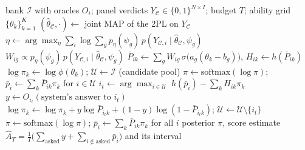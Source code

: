 \begin{algorithm}[t]
\caption{EOST-M: calibration-marginal adaptive test with one-step (myopic) expected-information-gain selection}
\label{alg:eost}
\small
\begin{algorithmic}[1]
\Require bank $\mathcal I$ with oracles $O_i$; panel verdicts $Y_{\mathcal C}\in\{0,1\}^{N\times I}$; budget $T$; ability grid $\{\theta_k\}_{k=1}^{K}$
\State $(\hat\theta_{\mathcal C},\cdot)\gets$ joint MAP of the 2PL on $Y_{\mathcal C}$ 
\State $\eta\gets\arg\max_\eta\sum_i\log\sum_g p_\eta(\psi_g)\,p(Y_{\mathcal C,i}\mid\hat\theta_{\mathcal C},\psi_g)$ 
\State $W_{ig}\propto p_\eta(\psi_g)\,p(Y_{\mathcal C,i}\mid\hat\theta_{\mathcal C},\psi_g)$ 
\State $\bar P_{ik}\gets\sum_gW_{ig}\,\sigma\big(a_g(\theta_k-b_g)\big)$, \;$H_{ik}\gets h(\bar P_{ik})$ 
\State $\log\pi_k\gets\log\phi(\theta_k)$;\; $\mathcal U\gets\mathcal I$ (candidate pool)
  \State $\pi\gets\mathrm{softmax}(\log\pi)$;\; $\bar p_i\gets\sum_k\bar P_{ik}\pi_k$ for $i\in\mathcal U$
  \State $i_t\gets\arg\max_{i\in\mathcal U}\;h(\bar p_i)-\sum_kH_{ik}\pi_k$ 
  \State $y\gets O_{i_t}(\text{system's answer to } i_t)$ 
  \State $\log\pi_k\gets\log\pi_k+y\log\bar P_{i_tk}+(1-y)\log(1-\bar P_{i_tk})$;\; $\mathcal U\gets\mathcal U\setminus\{i_t\}$
\EndFor
\State $\pi\gets\mathrm{softmax}(\log\pi)$;\; $\bar p_i\gets\sum_k\bar P_{ik}\pi_k$ for all $i$
\State \Return posterior $\pi$, score estimate $\hat A_T=\frac1I\big(\sum_{\text{asked}}y+\sum_{i\notin\text{asked}}\bar p_i\big)$ and its interval
\end{algorithmic}
\end{algorithm}
